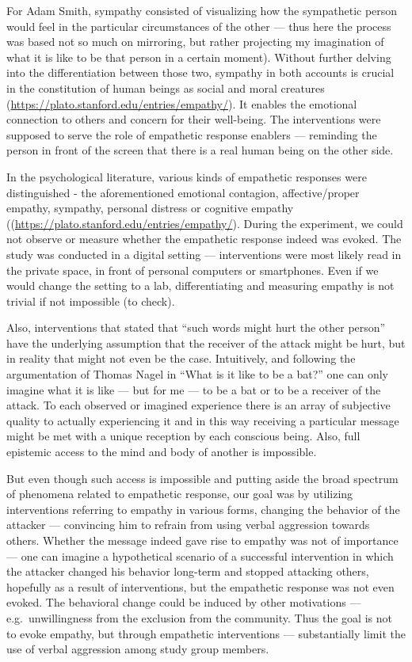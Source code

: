 \documentclass[
  10pt,
  dvipsnames,enabledeprecatedfontcommands]{scrartcl}
\begin{document}
For Adam Smith, sympathy consisted of visualizing how the sympathetic
person would feel in the particular circumstances of the other --- thus
here the process was based not so much on mirroring, but rather
projecting my imagination of what it is like to be that person in a
certain moment). Without further delving into the differentiation
between those two, sympathy in both accounts is crucial in the
constitution of human beings as social and moral creatures
(\url{https://plato.stanford.edu/entries/empathy/}). It enables the
emotional connection to others and concern for their well-being. The
interventions were supposed to serve the role of empathetic response
enablers --- reminding the person in front of the screen that there is a
real human being on the other side.

In the psychological literature, various kinds of empathetic responses
were distinguished - the aforementioned emotional contagion,
affective/proper empathy, sympathy, personal distress or cognitive
empathy ((\url{https://plato.stanford.edu/entries/empathy/}). During the
experiment, we could not observe or measure whether the empathetic
response indeed was evoked. The study was conducted in a digital setting
--- interventions were most likely read in the private space, in front
of personal computers or smartphones. Even if we would change the
setting to a lab, differentiating and measuring empathy is not trivial
if not impossible (to check).

Also, interventions that stated that ``such words might hurt the other
person'' have the underlying assumption that the receiver of the attack
might be hurt, but in reality that might not even be the case.
Intuitively, and following the argumentation of Thomas Nagel in ``What
is it like to be a bat?'' one can only imagine what it is like --- but
for me --- to be a bat or to be a receiver of the attack. To each
observed or imagined experience there is an array of subjective quality
to actually experiencing it and in this way receiving a particular
message might be met with a unique reception by each conscious being.
Also, full epistemic access to the mind and body of another is
impossible.

But even though such access is impossible and putting aside the broad
spectrum of phenomena related to empathetic response, our goal was by
utilizing interventions referring to empathy in various forms, changing
the behavior of the attacker --- convincing him to refrain from using
verbal aggression towards others. Whether the message indeed gave rise
to empathy was not of importance --- one can imagine a hypothetical
scenario of a successful intervention in which the attacker changed his
behavior long-term and stopped attacking others, hopefully as a result
of interventions, but the empathetic response was not even evoked. The
behavioral change could be induced by other motivations ---
e.g.~unwillingness from the exclusion from the community. Thus the goal
is not to evoke empathy, but through empathetic interventions ---
substantially limit the use of verbal aggression among study group
members.
\end{document}
